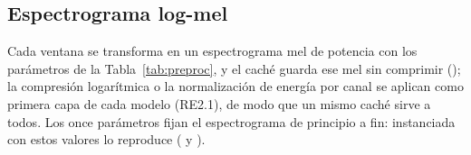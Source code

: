 \documentclass[12pt,a4paper]{article}
\begin{document}
\subsection{Espectrograma log-mel}

Cada ventana se transforma en un espectrograma mel de potencia con los parámetros de la
Tabla~\ref{tab:preproc}, y el caché guarda ese mel sin comprimir (); la
compresión logarítmica o la normalización de energía por canal se aplican como primera capa de
cada modelo (RE2.1), de modo que un mismo caché sirve a todos. Los once parámetros fijan el
espectrograma de principio a fin:  instanciada con
estos valores lo reproduce ( y ).

\end{document}

